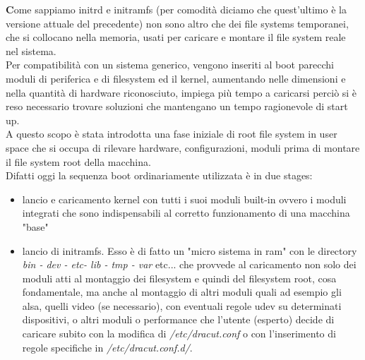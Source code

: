 \onehalfspacing
\lettrine[lines=1, loversize=0.1, lraise=0.1]{\color[cmyk]{0.5, 0, 1, 0}\bfseries C}{}ome sappiamo initrd e initramfs (per comodità diciamo che quest'ultimo è la versione attuale del precedente) non sono altro che dei file systems temporanei, che si collocano nella memoria, usati per caricare e montare il file system reale nel sistema.\\

Per compatibilità con un sistema generico, vengono inseriti al boot parecchi moduli di periferica e di filesystem ed il kernel, aumentando nelle dimensioni e nella quantità di hardware riconosciuto, impiega più tempo a caricarsi perciò si è reso necessario trovare soluzioni che mantengano un tempo ragionevole di start up.\\

A questo scopo è stata introdotta una fase iniziale di root file system in user space che si occupa di rilevare hardware, configurazioni, moduli prima di montare il file system root della macchina.\\

Difatti oggi la sequenza boot ordinariamente utilizzata è in due stages:
\begin{itemize}
 \item lancio e caricamento kernel con tutti i suoi moduli built-in ovvero i moduli integrati che sono indispensabili al corretto funzionamento di una macchina "base"
\item lancio di initramfs. Esso è di fatto un "micro sistema in ram" con le directory {\itshape bin - dev - etc- lib - tmp - var} etc... che provvede al caricamento non solo dei moduli atti al montaggio dei filesystem  e quindi del filesystem root, cosa fondamentale, ma anche al montaggio di altri moduli quali ad esempio gli alsa, quelli video (se necessario), con eventuali regole udev su determinati dispositivi, o altri moduli o performance che l'utente (esperto) decide di caricare subito con la modifica di {\itshape /etc/dracut.conf} o con l'inserimento di regole specifiche in {\itshape /etc/dracut.conf.d/}.
\end{itemize}

